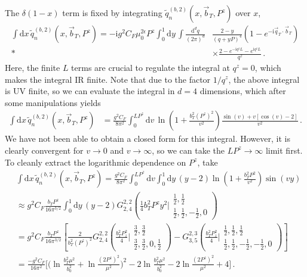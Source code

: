 \documentclass[11pt,a4paper]{article}
\newcommand{\df}{\mathrm{d}}
\newcommand{\img}{\mathrm{i}}
\newcommand{\eps}{\epsilon}
\newcommand{\nn}{\nonumber}
\newcommand{\Lb}[1]{\ln^{#1}\frac{b_T^2 \mu^2}{b_0^2}}
\newcommand{\bt}{\vec b_T}
\newcommand{\qt}{\vec q_T}
\begin{document}
The $\delta(1-x)$ term is fixed by integrating $\tilde q^{(b,2)}_n(x, \bt, P^z)$ over $x$,
\begin{align}
 \int \df x \, \tilde q^{(b,2)}_n(x, \bt, P^z)
 = -\img g^2 C_F \mu_0^{2\eps} P^z
  \int_0^1 \df y \, \int\frac{\df^d q}{(2\pi)^d} &\frac{2-y}{(q + y P)^4} (1 - e^{-\img \qt \cdot \bt})
  \nn\\*&\times
  \frac{2 - e^{-\img q^z L} - e^{\img q^z L}}{q^z}
\,.\end{align}
Here, the finite $L$ terms are crucial to regulate the integral at $q^z = 0$,
which makes the integral IR finite.
Note that due to the factor $1/q^z$, the above integral is UV finite,
so we can evaluate the integral in $d=4$ dimensions,
which after some manipulations yields
\begin{align} \label{eq:qtmd_b2_4}
 \int \df x \, \tilde q^{(b,2)}_n(x, \bt, P^z) &
 = \frac{g^2 C_F}{8 \pi^2}
  \int_0^{L P^z} \!\!\!\df v \, \ln\left(1 + \frac{b_T^2 (P^z)^2}{v^2}\right)
  \frac{\sin(v) + v [\cos(v) - 2]}{v^2}
\,.\end{align}
We have not been able to obtain a closed form for this integral.
However, it is clearly convergent for $v\to0$ and $v\to\infty$,
so we can take the $L P^z \to\infty$ limit first.
To cleanly extract the logarithmic dependence on $P^z$, take
\begin{align} \label{eq:sail delta approx}
 &\int \df x \, \tilde q^{(b,2)}_n(x, \bt, P^z)
 = \frac{g^2 C_F}{8 \pi^2}
  \int_0^{L P^z} \df v \int_0^1 \df y \,(y-2)
  \ln\left(1 + \frac{b_T^2 P^2}{v^2}\right) \sin(v y)
\nn\\&
 \approx
 g^2 C_F \frac{b_T P^z}{16 \pi^{3/2}} \int_0^1 \df y \, (y-2)
 G_{2,4}^{2,2} \left(
 \frac{1}{4} b_T^2 P^z y^2 \Bigg|
 \begin{matrix}\frac{1}{2} , \frac{1}{2} \\
 \frac{1}{2}, \frac{1}{2}, -\frac{1}{2}, 0
 \end{matrix}\right)
\nn\\&
 = g^2 C_F \frac{b_T P^z}{16 \pi^{3/2}} \left[
  \frac{2}{b_T^2 (P^z)^2}
  G_{2,4}^{2,2} \left(
  \frac{b_T^2 P_z^2}{4} \Bigg|
  \begin{matrix}\frac{3}{2} , \frac{3}{2} \\
  \frac{3}{2}, \frac{3}{2}, 0, \frac{1}{2}
  \end{matrix}\right)
 -
  G_{3,5}^{2,3} \left(
  \frac{b_T^2 P_z^2}{4} \Bigg|
  \begin{matrix}\frac{1}{2} , \frac{1}{2} , \frac{1}{2} \\
  \frac{1}{2}, \frac{1}{2}, -\frac{1}{2}, -\frac{1}{2} , 0
  \end{matrix}\right) \right]
\nn\\&
 = \frac{-g^2 C_F}{16\pi^2} \biggl[ \biggl(\Lb{} + \ln\frac{(2P^z)^2}{\mu^2}\biggr)^2
   - 2 \Lb{} -2 \ln\frac{(2P^z)^2}{\mu^2} + 4 \biggr]
\,.\end{align}
\end{document}

